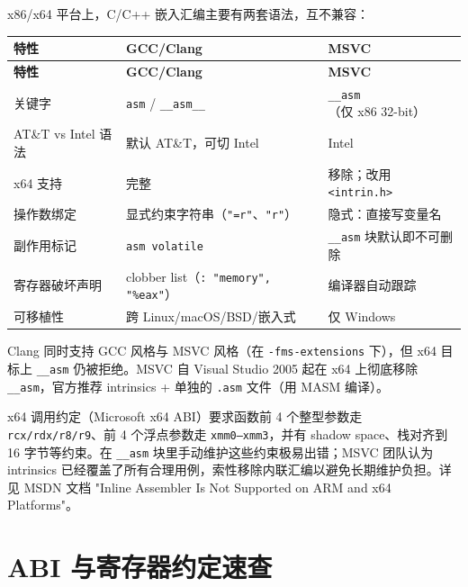 \documentclass[12pt,a4paper,fontset=fandol]{ctexbook}
\newcommand{\cpp}[1]{C++#1}
\begin{document}
x86/x64 平台上，C/\allowbreak{}\cpp{} 嵌入汇编主要有两套语法，互不兼容：

\begin{longtable}{>{\raggedright\arraybackslash}p{2.2cm}>{\raggedright\arraybackslash}p{5.6cm}>{\raggedright\arraybackslash}p{5.6cm}}
\toprule
\textbf{特性} & \textbf{GCC/Clang} & \textbf{MSVC} \\
\midrule
\endfirsthead
\toprule
\textbf{特性} & \textbf{GCC/Clang} & \textbf{MSVC} \\
\midrule
\endhead
关键字              & \texttt{asm} / \texttt{\_\_asm\_\_}              & \texttt{\_\_asm}（仅 x86 32-bit） \\
AT\&T vs Intel 语法 & 默认 AT\&T，可切 Intel                            & Intel \\
x64 支持            & 完整                                              & 移除；改用 \texttt{<intrin.h>} \\
操作数绑定          & 显式约束字符串（\texttt{"=r"}、\texttt{"r"}）       & 隐式：直接写变量名 \\
副作用标记          & \texttt{asm volatile}                             & \texttt{\_\_asm} 块默认即不可删除 \\
寄存器破坏声明      & clobber list（\texttt{: "memory", "\%eax"}）       & 编译器自动跟踪 \\
可移植性            & 跨 Linux/macOS/BSD/嵌入式                         & 仅 Windows \\
\bottomrule
\end{longtable}

Clang 同时支持 GCC 风格与 MSVC 风格（在 \texttt{-fms-extensions} 下），但 x64 目标上 \texttt{\_\_asm} 仍被拒绝。MSVC 自 Visual Studio 2005 起在 x64 上彻底移除 \texttt{\_\_asm}，官方推荐 intrinsics + 单独的 \texttt{.asm} 文件（用 MASM 编译）。

\begin{tcolorbox}[note={为什么 MSVC 在 x64 上移除 \_\_asm}]
x64 调用约定（Microsoft x64 ABI）要求函数前 4 个整型参数走 \texttt{rcx/rdx/r8/r9}、前 4 个浮点参数走 \texttt{xmm0--xmm3}，并有 shadow space、栈对齐到 16 字节等约束。在 \texttt{\_\_asm} 块里手动维护这些约束极易出错；MSVC 团队认为 intrinsics 已经覆盖了所有合理用例，索性移除内联汇编以避免长期维护负担。详见 MSDN 文档 "Inline Assembler Is Not Supported on ARM and x64 Platforms"。
\end{tcolorbox}

\section{ABI 与寄存器约定速查}\label{sec:abi}
\end{document}
